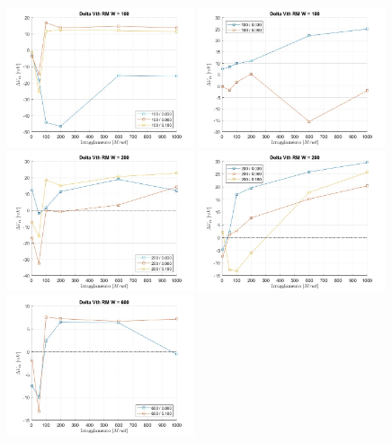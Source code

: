 \documentclass[
	a4paper,
	cleardoublepage=empty,
	headings=twolinechapter,
	numbers=autoenddot,
]{scrbook}
\begin{document}
\begin{figure}[H]
  \centering
  \includegraphics[width=0.49\textwidth]{sovrapposizione-deltaVth-RM-N100}
  \includegraphics[width=0.49\textwidth]{sovrapposizione-deltaVth-RM-P100}
  \includegraphics[width=0.49\textwidth]{sovrapposizione-deltaVth-RM-N200}
  \includegraphics[width=0.49\textwidth]{sovrapposizione-deltaVth-RM-P200}
  \includegraphics[width=0.49\textwidth]{sovrapposizione-deltaVth-RM-N600}

\end{figure}
\end{document}
